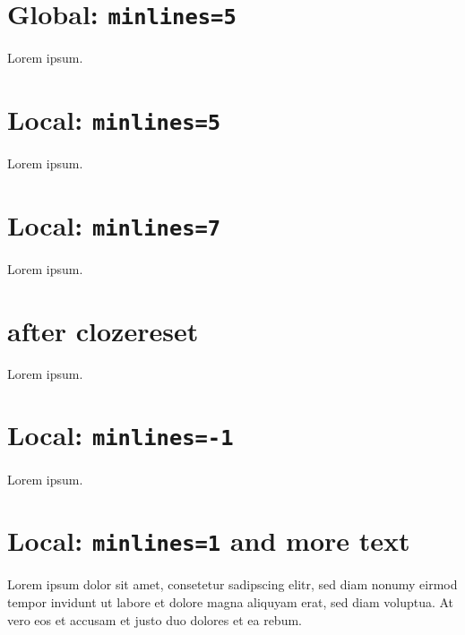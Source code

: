 \documentclass{article}
\begin{document}
{}

\section{Global: \texttt{minlines=5}}

\begin{clozepar}
Lorem ipsum.
\end{clozepar}

\section{Local: \texttt{minlines=5}}

\begin{clozepar}[minlines=5]
Lorem ipsum.
\end{clozepar}

\section{Local: \texttt{minlines=7}}

\begin{clozepar}[minlines=7]
Lorem ipsum.
\end{clozepar}

\section{after clozereset}

\clozereset

\begin{clozepar}
Lorem ipsum.
\end{clozepar}

\section{Local: \texttt{minlines=-1}}

\begin{clozepar}[minlines=-1]
Lorem ipsum.
\end{clozepar}

\section{Local: \texttt{minlines=1} and more text }

\begin{clozepar}[minlines=-1]
Lorem ipsum dolor sit amet, consetetur sadipscing elitr, sed diam nonumy
eirmod tempor invidunt ut labore et dolore magna aliquyam erat, sed diam
voluptua. At vero eos et accusam et justo duo dolores et ea
rebum.
\end{clozepar}
\end{document}
